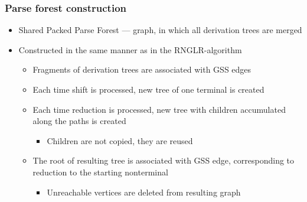 \documentclass{beamer}
\begin{document}
\begin{frame}
  \transwipe[direction=90]
  \frametitle{Parse forest construction}
  \begin{itemize}
    \item Shared Packed Parse Forest --- graph, in which all derivation trees are merged
    \item Constructed in the same manner as in the RNGLR-algorithm
    \begin{itemize}
      \item Fragments of derivation trees are associated with GSS edges
      \item Each time shift is processed, new tree of one terminal is created
      \item Each time reduction is processed, new tree with children accumulated along the paths is created
      \begin{itemize}
        \item Children are not copied, they are reused        
      \end{itemize}
      \item The root of resulting tree is associated with GSS edge, corresponding to reduction to the starting nonterminal
      \begin{itemize}
        \item Unreachable vertices are deleted from resulting graph
      \end{itemize}
    \end{itemize}
  \end{itemize}
\end{frame}
\end{document}
